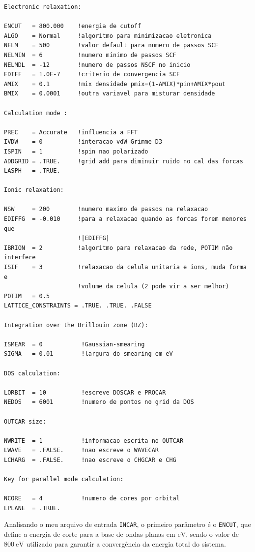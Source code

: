 \begin{verbatim}
Electronic relaxation:

ENCUT   = 800.000    !energia de cutoff
ALGO    = Normal     !algoritmo para minimizacao eletronica
NELM    = 500        !valor default para numero de passos SCF
NELMIN  = 6          !numero minimo de passos SCF
NELMDL  = -12        !numero de passos NSCF no inicio
EDIFF   = 1.0E-7     !criterio de convergencia SCF
AMIX    = 0.1        !mix densidade pmix=(1-AMIX)*pin+AMIX*pout
BMIX    = 0.0001     !outra variavel para misturar densidade

Calculation mode :

PREC    = Accurate   !influencia a FFT
IVDW    = 0          !interacao vdW Grimme D3
ISPIN   = 1          !spin nao polarizado
ADDGRID = .TRUE.     !grid add para diminuir ruido no cal das forcas
LASPH   = .TRUE.

Ionic relaxation:

NSW     = 200        !numero maximo de passos na relaxacao
EDIFFG  = -0.010     !para a relaxacao quando as forcas forem menores que
                     !|EDIFFG|
IBRION  = 2          !algoritmo para relaxacao da rede, POTIM não interfere
ISIF    = 3          !relaxacao da celula unitaria e ions, muda forma e
                     !volume da celula (2 pode vir a ser melhor)
POTIM   = 0.5
LATTICE_CONSTRAINTS = .TRUE. .TRUE. .FALSE

Integration over the Brillouin zone (BZ):

ISMEAR  = 0           !Gaussian-smearing
SIGMA   = 0.01        !largura do smearing em eV

DOS calculation:

LORBIT  = 10          !escreve DOSCAR e PROCAR
NEDOS   = 6001        !numero de pontos no grid da DOS

OUTCAR size:

NWRITE  = 1           !informacao escrita no OUTCAR
LWAVE   = .FALSE.     !nao escreve o WAVECAR
LCHARG  = .FALSE.     !nao escreve o CHGCAR e CHG

Key for parallel mode calculation:

NCORE   = 4           !numero de cores por orbital
LPLANE  = .TRUE.
\end{verbatim}

Analisando o meu arquivo de entrada \texttt{INCAR}, o primeiro parâmetro é o \texttt{ENCUT}, que
define a energia de corte para a base de ondas planas em $\unit{\electronvolt}$, sendo o valor de
$\SI{800}{\eV}$ utilizado para garantir a convergência da energia total do sistema.

